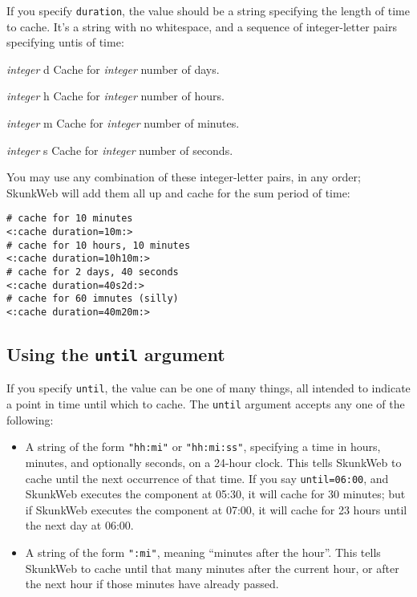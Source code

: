 \documentclass{manual}
\begin{document}
{{If you specify \texttt{duration}, the value should be 
a string specifying the length of time to cache. It's a 
string with no whitespace, and a sequence of integer-letter
pairs specifying untis of time:

\begin{argdesc}

\item[\emph{integer} d]
Cache for \emph{integer} number of days.
\item[\emph{integer} h]
Cache for \emph{integer} number of hours.
\item[\emph{integer} m]
Cache for \emph{integer} number of minutes.
\item[\emph{integer} s]
Cache for \emph{integer} number of seconds.
\end{argdesc}

You may use any combination of these integer-letter pairs,
in any order; SkunkWeb will add them all up and cache for the sum
period of time:

\begin{verbatim}
# cache for 10 minutes
<:cache duration=10m:>
# cache for 10 hours, 10 minutes
<:cache duration=10h10m:>
# cache for 2 days, 40 seconds
<:cache duration=40s2d:>
# cache for 60 imnutes (silly)
<:cache duration=40m20m:>
\end{verbatim}

\subsection{Using the \texttt{until} argument}

If you specify \texttt{until}, the value can be one
of many things, all intended to indicate a point in time
until which to cache. The \texttt{until} argument accepts
any one of the following:

\begin{itemize}
\item A string of the form \texttt{"hh:mi"} or
\texttt{"hh:mi:ss"}, specifying a time in hours, minutes,
and optionally seconds, on a 24-hour clock. This tells SkunkWeb
to cache until the next occurrence of that time. If you say
\texttt{until=06:00}, and SkunkWeb executes the component at 
05:30, it will cache for 30 minutes; but if SkunkWeb executes the 
component at 07:00, it will cache for 23 hours until the next
day at 06:00.

\item A string of the form \texttt{":mi"}, meaning 
``minutes after the hour''. This tells SkunkWeb to cache until
that many minutes after the current hour, or after the
next hour if those minutes have already passed.


\end{itemize}}}
\end{document}
